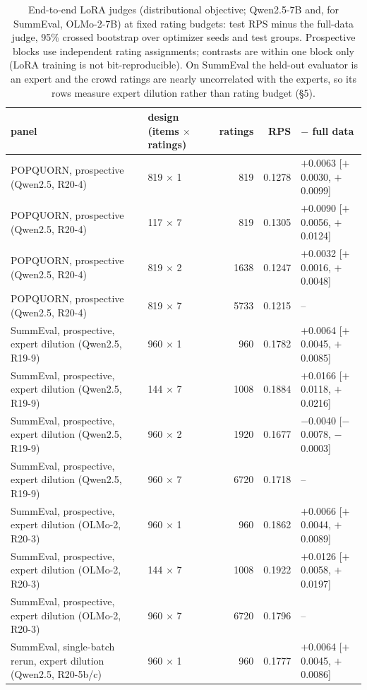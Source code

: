 \begin{table}[t]\centering\footnotesize
\caption{End-to-end LoRA judges (distributional objective; Qwen2.5-7B and, for SummEval, OLMo-2-7B) at fixed rating budgets: test RPS minus the full-data judge, 95\% crossed bootstrap over optimizer seeds and test groups. Prospective blocks use independent rating assignments; contrasts are within one block only (LoRA training is not bit-reproducible). On SummEval the held-out evaluator is an expert and the crowd ratings are nearly uncorrelated with the experts, so its rows measure expert dilution rather than rating budget (\S5).}\label{tab:budget}
\begin{tabular}{llrrl}\toprule panel & design (items $\times$ ratings) & ratings & RPS & $-$ full data \\\midrule
POPQUORN, prospective (Qwen2.5, R20-4) & 819 $\times$ 1 & 819 & 0.1278 & $+$0.0063 [$+$0.0030, $+$0.0099] \\
POPQUORN, prospective (Qwen2.5, R20-4) & 117 $\times$ 7 & 819 & 0.1305 & $+$0.0090 [$+$0.0056, $+$0.0124] \\
POPQUORN, prospective (Qwen2.5, R20-4) & 819 $\times$ 2 & 1638 & 0.1247 & $+$0.0032 [$+$0.0016, $+$0.0048] \\
POPQUORN, prospective (Qwen2.5, R20-4) & 819 $\times$ 7 & 5733 & 0.1215 & -- \\
\midrule
SummEval, prospective, expert dilution (Qwen2.5, R19-9) & 960 $\times$ 1 & 960 & 0.1782 & $+$0.0064 [$+$0.0045, $+$0.0085] \\
SummEval, prospective, expert dilution (Qwen2.5, R19-9) & 144 $\times$ 7 & 1008 & 0.1884 & $+$0.0166 [$+$0.0118, $+$0.0216] \\
SummEval, prospective, expert dilution (Qwen2.5, R19-9) & 960 $\times$ 2 & 1920 & 0.1677 & $-$0.0040 [$-$0.0078, $-$0.0003] \\
SummEval, prospective, expert dilution (Qwen2.5, R19-9) & 960 $\times$ 7 & 6720 & 0.1718 & -- \\
\midrule
SummEval, prospective, expert dilution (OLMo-2, R20-3) & 960 $\times$ 1 & 960 & 0.1862 & $+$0.0066 [$+$0.0044, $+$0.0089] \\
SummEval, prospective, expert dilution (OLMo-2, R20-3) & 144 $\times$ 7 & 1008 & 0.1922 & $+$0.0126 [$+$0.0058, $+$0.0197] \\
SummEval, prospective, expert dilution (OLMo-2, R20-3) & 960 $\times$ 7 & 6720 & 0.1796 & -- \\
\midrule
SummEval, single-batch rerun, expert dilution (Qwen2.5, R20-5b/c) & 960 $\times$ 1 & 960 & 0.1777 & $+$0.0064 [$+$0.0045, $+$0.0086] \\

\end{tabular}
\end{table}
